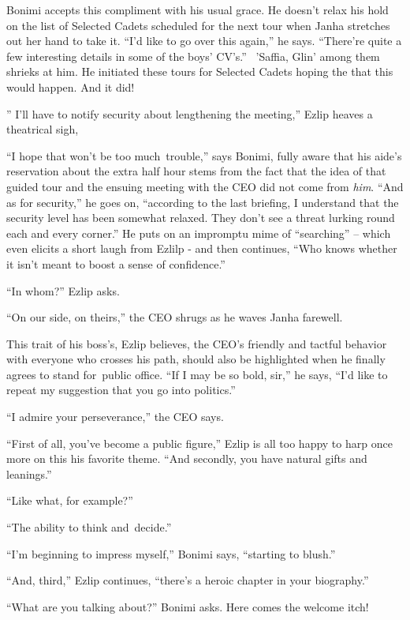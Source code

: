 \documentclass[twoside,11pt]{book}
\begin{document}
Bonimi accepts this compliment with his usual grace. He doesn't relax his hold on the list of Selected
Cadets{ }scheduled for the next tour when Janha stretches out her hand to take it. ``I'd
like to go over this again,'' he says. ``There're quite a few interesting details in some of
the boys' CV's.'' \ {}'Saffia, Glin' among them shrieks at him. He initiated these tours for Selected
Cadets hoping the that this would happen. And{ }it did!~~

'' I'll have to notify security about lengthening the meeting,'' Ezlip heaves a theatrical
sigh,

``I hope that won't be too much~trouble,'' says Bonimi, fully aware that his aide's
reservation about the extra half hour stems from the fact that the idea of that guided tour and the{
}ensuing meeting with the CEO did not come from \textit{him}. ``And as for security,'' he
goes on, ``according to the last briefing, I understand that the security level has been somewhat relaxed.
They don't see a threat lurking round each and every corner.'' He puts on an impromptu mime of
``searching'' -- which even elicits a short laugh from Ezlilp - and then continues, ``Who knows whether it
isn't meant to boost a sense of confidence.''

``In whom?'' Ezlip asks.

``On our side, on theirs,'' the CEO shrugs as he waves Janha farewell.

This trait of his boss's, Ezlip believes,{ }the CEO's friendly and tactful
behavior with everyone who crosses his path, should also be highlighted when he finally agrees to stand for~public
office. ``If I may be so bold, sir,'' he says, ``I'd like to repeat my suggestion that you go into
politics.''

``I admire your perseverance,'' the CEO says.

``First of all, you've become a public figure,'' Ezlip is all too happy to harp once more on
this his favorite theme. ``And secondly, you have natural gifts and leanings.''

``Like what, for example?''

``The ability to think and~decide.''

``I'm beginning to impress myself,'' Bonimi says, ``starting to
blush.''

``And, third,'' Ezlip continues, ``there's a heroic chapter in your biography.''

``What are you talking about?'' Bonimi asks. Here comes the welcome itch!~
\end{document}
